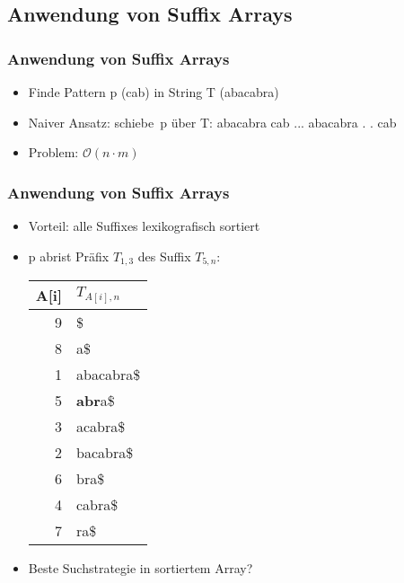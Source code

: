 \documentclass{beamer}
\begin{document}
\subsection{Anwendung von Suffix Arrays}
\begin{frame}
\frametitle{Anwendung von Suffix Arrays}
\begin{itemize}
\item Finde Pattern p (\glqq cab\grqq) in String T (\glqq abacabra\grqq)
\item Naiver Ansatz: \glqq schiebe\grqq\ p über T: \newline
{\ttfamily
abacabra \newline
cab\textrightarrow \newline
...\newline
abacabra \newline
. . cab
}
\item Problem: $\mathcal{O}(n\cdot m)$
\end{itemize}
\end{frame}
%
\begin{frame}
\frametitle{Anwendung von Suffix Arrays}
\begin{itemize}
\item Vorteil: alle Suffixes lexikografisch sortiert
\item p \glqq abr\grqq ist Präfix $T_{1,3}$ des Suffix $T_{5,n}$: \newline
\begin{tabular}{r|l<{\ttfamily}}
\textbf{A[i]} & \textbf{$T_{A[i],n}$}\\\hline
9 & \$\\
8 & a\$\\
1 & abacabra\$\\
5 & {\color{red}\textbf{abr}}a\$\\
3 & acabra\$\\
2 & bacabra\$\\
6 & bra\$\\
4 & cabra\$\\
7 & ra\$\\
\end{tabular}
\item Beste Suchstrategie in sortiertem Array?
\end{itemize}
\end{frame}
\end{document}
